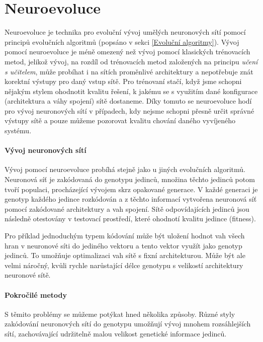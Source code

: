 \section{Neuroevoluce} \label{NN - evolve}
Neuroevoluce \citet{Lehman:2013} je technika pro evoluční vývoj umělých
neuronových sítí pomocí principů evolučních algoritmů (popsáno v sekci
\ref{Evoluční algoritmy}). Vývoj pomocí neuroevoluce je méně omezený než vývoj
pomocí klasických trénovacích metod, jelikož vývoj, na rozdíl od trénovacích
metod založených na principu \emph{učení s učitelem}, může probíhat i na sítích
proměnlivé architektury a nepotřebuje znát korektní výstupy pro daný vstup
sítě. Pro trénovaní stačí, když jsme schopni nějakým stylem ohodnotit kvalitu
řešení, k jakému se s využitím dané konfigurace (architektura a váhy spojení)
sítě dostaneme. Díky tomuto se neuroevoluce hodí pro vývoj neuronových sítí v
případech, kdy nejsme schopni přesně určit správné výstupy sítě a pouze můžeme
pozorovat kvalitu chování daného vyvíjeného systému.

\paragraph{Vývoj neuronových sítí}
Vývoj pomocí neuroevoluce probíhá stejně jako u jiných evolučních algoritmů.
Neuronová síť je zakódovaná do genotypu jedinců, množina těchto jedinců potom
tvoří populaci, procházející vývojem skrz opakované generace. V každé generaci
je genotyp každého jedince rozkódován a z těchto informací vytvořena neuronová
síť pomocí zakódované architektury a vah spojení. Sítě odpovídajících jedinců
jsou následně otestovány v testovací prostředí, které ohodnotí kvalitu jedince
(fitness).

Pro příklad jednoduchým typem kódování může být uložení hodnot vah všech hran v
neuronové  síti do jediného vektoru a tento vektor využít jako genotyp jedinců.
To umožňuje optimalizaci vah sítě s fixní architekturou. Může být ale velmi
náročný, kvůli rychle narůstající délce genotypu s velikostí architektury
neuronové sítě.

\paragraph{Pokročilé metody}
S těmito problémy se můžeme potýkat hned několika způsoby. Různé styly
zakódování neuronových sítí do genotypu umožňují vývoj mnohem
rozsáhlejších sítí, zachovávající udržitelně malou velikost genetické
informace jedinců. 

